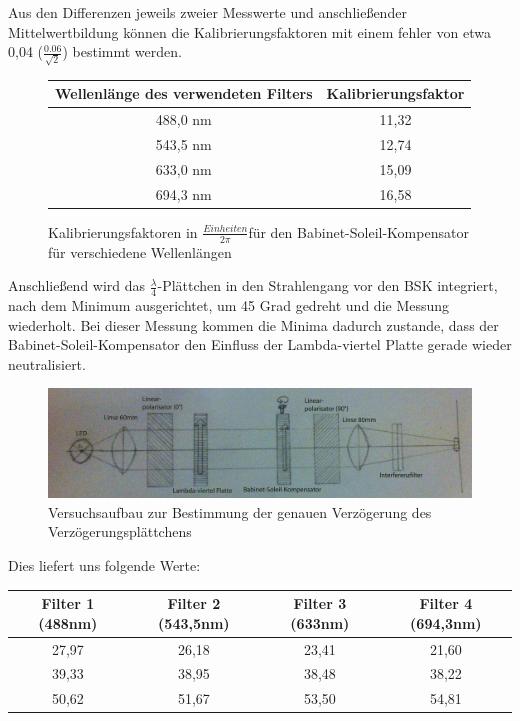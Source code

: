 \documentclass[bigchapter,colorback,accentcolor=tud4b,linedtoc,11pt]{tudreport}
\begin{document}
Aus den Differenzen jeweils zweier Messwerte und anschließender Mittelwertbildung können die Kalibrierungsfaktoren mit einem fehler von etwa 0,04 ($\frac{0.06}{\sqrt{2}}$) bestimmt werden.

\begin{figure}[h]
  \begin{center}
    \begin{tabular}{|c|c|}
      \hline
      Wellenlänge des verwendeten Filters & Kalibrierungsfaktor \\ \hline
      488,0 nm                               & 11,32               \\ \hline
      543,5 nm                              & 12,74               \\ \hline
      633,0 nm                              & 15,09               \\ \hline
      694,3 nm                              & 16,58               \\ \hline
    \end{tabular}
  \end{center}
  \caption{Kalibrierungsfaktoren in $\frac{Einheiten}{2\pi}$für den Babinet-Soleil-Kompensator für verschiedene Wellenlängen}
\end{figure}


Anschließend wird das $\frac{\lambda}{4}$-Plättchen in den Strahlengang vor den BSK integriert, nach dem Minimum ausgerichtet, um 45 Grad gedreht und die Messung wiederholt. Bei dieser Messung kommen die Minima dadurch zustande, dass der Babinet-Soleil-Kompensator den Einfluss der Lambda-viertel Platte gerade wieder neutralisiert.

\begin{figure}[h]
  \centering
    \includegraphics[width=150mm]{img/skizzen/versuch_c_2.jpg}
    \caption{Versuchsaufbau zur Bestimmung der genauen Verzögerung des Verzögerungsplättchens}
\end{figure}

Dies liefert uns folgende Werte:

\begin{center}
  \begin{tabular}{|c|c|c|c|}
    \hline
        Filter 1 (488nm) & Filter 2 (543,5nm) & Filter 3 (633nm) & Filter 4 (694,3nm) \\ \hline
        27,97 & 26,18 & 23,41 & 21,60 \\ \hline
        39,33 & 38,95 & 38,48 & 38,22 \\ \hline
        50,62 & 51,67 & 53,50 & 54,81 \\ \hline
	\end{tabular}
\end{center}
\end{document}
